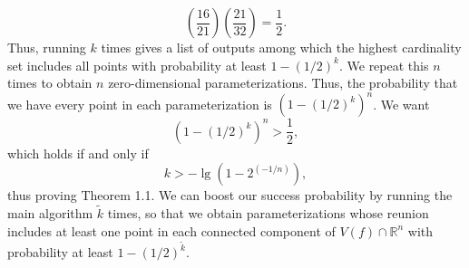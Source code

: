 \documentclass[sigconf]{acmart}
\def\R{\mathbb{R}}
\def\kt{\widetilde{k}}
\begin{document}
\[
\left( \frac{16}{21} \right) \left( \frac{21}{32} \right) = \frac{1}{2}.
\]
Thus, running \cite[Algorithm 2]{SH} $k$ times gives a list of outputs among which the highest cardinality set includes all points with probability at least $1-(1/2)^k$. We repeat this $n$ times to obtain $n$ zero-dimensional parameterizations. Thus, the probability that we have every point in each parameterization is $(1-(1/2)^k)^n$. We want 
\[
(1-(1/2)^k)^n>\frac{1}{2},
\]
which holds if and only if 
\[
k > -\lg(1-2^{(-1/n)}),
\]
thus proving Theorem 1.1. We can boost our success probability by running the main algorithm $\kt$ times, so that we obtain parameterizations whose reunion includes at least one point in each connected component of $V(f) \cap \R^n$ with probability at least $1 - (1/2)^{\kt}$. 


\end{document}
